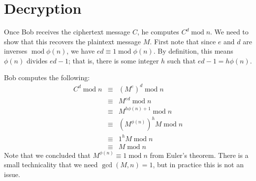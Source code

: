 \documentclass{book}
\theoremstyle{plain}
\theoremstyle{definition}
\renewcommand{\mod}{\operatorname{mod}}
\renewcommand{\mod}{\operatorname{mod}}
\begin{document}
\section{Decryption}
Once Bob receives the ciphertext message $C$, he computes $C^d \mod n$. We need to show that this recovers the plaintext message $M$. First note that since $e$ and $d$ are inverses $\mod \phi(n)$, we have $ed \equiv 1 \mod \phi(n)$. By definition, this means $\phi(n)$ divides $ed - 1$; that is, there is some integer $h$ such that $ed-1 = h\phi(n)$.

Bob computes the following:
\begin{eqnarray*}
C^d \mod n &\equiv& (M^e)^d \mod n \\
&\equiv& M^{ed} \mod n \\
&\equiv& M^{h\phi(n) + 1} \mod n \\
&\equiv& (M^{\phi(n)})^hM \mod n \\
&\equiv& 1^hM \mod n \\
&\equiv& M \mod n
\end{eqnarray*}
Note that we concluded that $M^{\phi(n)} \equiv 1 \mod n$ from Euler's theorem. There is a small technicality that we need $\gcd(M,n) = 1$, but in practice this is not an issue.
\end{document}
